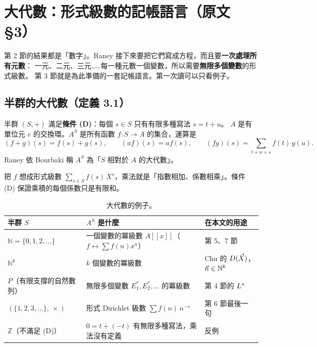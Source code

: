 \section{大代數：形式級數的記帳語言（原文 §3）}\label{sec:algebra}

第 2 節的結果都是「數字」。Raney 接下來要把它們寫成方程，而且要\textbf{一次處理所有元數}：
一元、二元、三元……每一種元數一個變數，所以需要\textbf{無限多個變數}的形式級數。
第 3 節就是為此準備的一套記帳語言。第一次讀可以只看例子。

\subsection{半群的大代數（定義 3.1）}

\begin{thmbox}[定義 3.1 \paper{p.~444}]
半群 $(S,+)$ 滿足\textbf{條件 (D)}：每個 $s\in S$ 只有有限多種寫法 $s=t+u$。
$A$ 是有單位元 $e$ 的交換環。$A^S$ 是所有函數 $f:S\to A$ 的集合，運算是
\[
(f+g)(s)=f(s)+g(s),\qquad (af)(s)=af(s),\qquad (fg)(s)=\sum_{t+u=s}f(t)\,g(u).
\]
Raney 依 Bourbaki 稱 $A^S$ 為「$S$ 相對於 $A$ 的大代數」。
\end{thmbox}

把 $f$ 想成形式級數 $\sum_{s\in S}f(s)\,X^s$，乘法就是「指數相加、係數相乘」。條件 (D) 保證乘積的每個係數只是有限和。

\begin{table}[H]
\centering
\small
\begin{tabular}{@{}lll@{}}
\toprule
半群 $S$ & $A^S$ 是什麼 & 在本文的用途\\
\midrule
$\mathbb N=\{0,1,2,\ldots\}$ & 一個變數的冪級數 $A[[x]]$（$f\leftrightarrow\sum f(n)x^n$） & 第 5、7 節\\
$\mathbb N^k$ & $k$ 個變數的冪級數 & Chu 的 $D(\vec X)$，$\vec n\in\mathbb N^k$\\
$P$（有限支撐的自然數列） & 無限多個變數 $E_1^*,E_2^*,\ldots$ 的冪級數 & 第 4 節的 $L^{*}$\\
$(\{1,2,3,\ldots\},\ \times)$ & 形式 Dirichlet 級數 $\sum f(n)\,n^{-s}$ & 第 6 節最後一句\\
\midrule
$\mathbb Z$（不滿足 (D)） & $0=t+(-t)$ 有無限多種寫法，乘法沒有定義 & 反例\\
\bottomrule
\end{tabular}
\caption{大代數的例子。}
\end{table}

